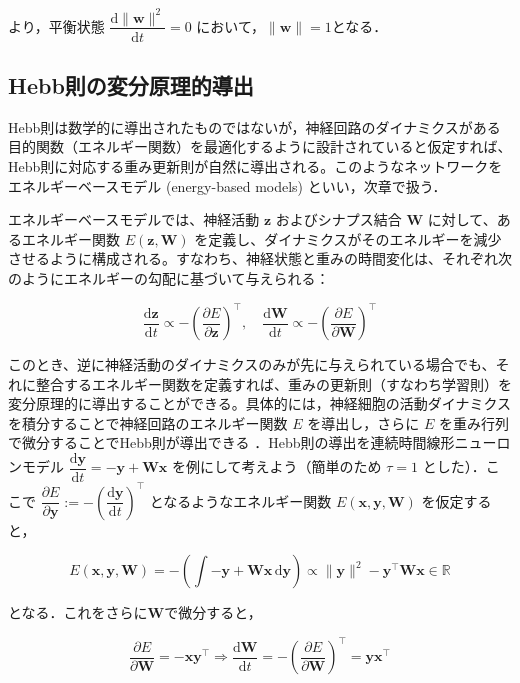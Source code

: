 \documentclass[titlepage]{ltjsbook}
\begin{document}
より，平衡状態 $\dfrac{\mathrm{d}\|\mathbf{w}\|^2}{\mathrm{d}t}=0$ において，$\|\mathbf{w}\|= 1$となる．

\subsection{Hebb則の変分原理的導出}
Hebb則は数学的に導出されたものではないが，神経回路のダイナミクスがある目的関数（エネルギー関数）を最適化するように設計されていると仮定すれば、Hebb則に対応する重み更新則が自然に導出される。このようなネットワークをエネルギーベースモデル (energy-based models) といい，次章で扱う．

エネルギーベースモデルでは、神経活動 $\mathbf{z}$ およびシナプス結合 $\mathbf{W}$ に対して、あるエネルギー関数 $E(\mathbf{z}, \mathbf{W})$ を定義し、ダイナミクスがそのエネルギーを減少させるように構成される。すなわち、神経状態と重みの時間変化は、それぞれ次のようにエネルギーの勾配に基づいて与えられる：

\begin{equation}
\frac{\mathrm{d}\mathbf{z}}{\mathrm{d}t}\propto-\left(\frac{\partial E}{\partial \mathbf{z}}\right)^\top,\quad \frac{\mathrm{d} \mathbf{W}}{\mathrm{d}t}\propto-\left(\frac{\partial E}{\partial \mathbf{W}}\right)^\top
\end{equation}

このとき、逆に神経活動のダイナミクスのみが先に与えられている場合でも、それに整合するエネルギー関数を定義すれば、重みの更新則（すなわち学習則）を変分原理的に導出することができる。具体的には，神経細胞の活動ダイナミクスを積分することで神経回路のエネルギー関数 $E$ を導出し，さらに $E$ を重み行列で微分することでHebb則が導出できる \citep{Isomura2020-sn}．Hebb則の導出を連続時間線形ニューロンモデル $\dfrac{\mathrm{d}\mathbf{y}}{\mathrm{d}t}=-\mathbf{y}+\mathbf{W}\mathbf{x}$ を例にして考えよう（簡単のため $\tau=1$ とした）．ここで $\dfrac{\partial E}{\partial\mathbf{y}}:=-\left(\dfrac{\mathrm{d}\mathbf{y}}{\mathrm{d}t}\right)^\top$ となるようなエネルギー関数 $E(\mathbf{x}, \mathbf{y}, \mathbf{W})$ を仮定すると，

\begin{equation}
E(\mathbf{x}, \mathbf{y}, \mathbf{W})=-\left(\int -\mathbf{y}+\mathbf{W}\mathbf{x}\,\mathrm{d}\mathbf{y}\right)\propto\|\mathbf{y}\|^2-\mathbf{y}^\top \mathbf{W}\mathbf{x} \in \mathbb{R}
\end{equation}

となる．これをさらに$\mathbf{W}$で微分すると，

\begin{equation}
\dfrac{\partial E}{\partial\mathbf{W}}=-\mathbf{x}\mathbf{y}^\top\Rightarrow
\frac{\mathrm{d}\mathbf{W}}{\mathrm{d}t}=-\left(\frac{\partial E}{\partial \mathbf{W}}\right)^\top=\mathbf{y}\mathbf{x}^\top
\end{equation}
\end{document}
